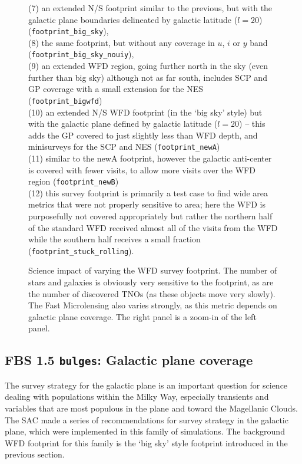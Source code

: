 \begin{figure}
{ (7) an extended N/S footprint similar to the previous, but with the galactic plane boundaries delineated by galactic latitude ($l=20$) ({\tt footprint\_big\_sky}),\\
 (8) the same footprint, but without any coverage in $u$, $i$ or $y$ band ({\tt footprint\_big\_sky\_nouiy}),\\
 (9) an extended WFD region, going further north in the sky (even further than big sky) although not as far south, includes SCP and GP coverage with a small extension for the NES ({\tt footprint\_bigwfd}) \\
 (10) an extended N/S WFD footprint (in the `big sky' style) but with the galactic plane defined by galactic latitude ($l=20$) -- this adds the GP covered to just slightly less than WFD depth, and minisurveys for the SCP and  NES ({\tt footprint\_newA}) \\
 (11) similar to the newA footprint, however the galactic anti-center is covered with fewer visits, to allow more visits over the WFD region ({\tt footprint\_newB}) \\
 (12) this survey footprint is primarily a test case to find wide area metrics that were not properly sensitive to area; here the WFD is purposefully not covered appropriately but rather the northern half of the standard WFD received almost all of the visits from the WFD while the southern half receives a small fraction ({\tt footprint\_stuck\_rolling}).\\
}
\label{fig:footprints_footprints}
\end{figure}

\begin{figure}
\caption{Science impact of varying the WFD survey footprint. The number of stars and galaxies is obviously very sensitive to the footprint, as are the number of discovered TNOs (as these objects move very slowly). The Fast Microlensing also varies strongly, as this metric depends on galactic plane coverage. The right panel is a zoom-in of the left panel.}
\label{fig:footprint_radar}
\end{figure}

\subsection{FBS 1.5 {\tt bulges}: Galactic plane coverage}\label{ss:bulges}

The survey strategy for the galactic plane is an important question for science dealing with populations within the Milky Way, especially transients and variables that are most populous in the plane and toward the Magellanic Clouds. The SAC made a series of recommendations for survey strategy in the galactic plane, which were implemented in this family of simulations. The background WFD footprint for this family is the `big sky' style footprint introduced in the previous section. 

